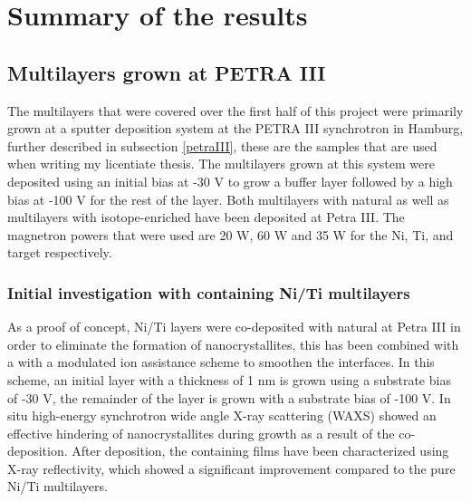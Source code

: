 \chapter{Summary of the results}\label{summaryresults}
\section{Multilayers grown at PETRA III}
The multilayers that were covered over the first half of this project were primarily grown at a sputter deposition system at the PETRA III synchrotron in Hamburg, further described in subsection \ref{petraIII}, these are the samples that are used when writing my licentiate thesis. The multilayers grown at this system were deposited using an initial bias at -30 V to grow a buffer layer followed by a high bias at -100 V for the rest of the layer. Both multilayers with natural \natBC as well as multilayers with isotope-enriched \BC have been deposited at Petra III. The magnetron powers that were used are 20 W, 60 W and 35 W for the Ni, Ti, and \natBC target respectively.\\
\subsection{Initial investigation with \natBC containing Ni/Ti multilayers}
As a proof of concept, Ni/Ti layers were co-deposited with natural \natBC at Petra III in order to eliminate the formation of nanocrystallites, this has been combined with a with a modulated ion assistance scheme to smoothen the interfaces. In this scheme, an initial layer with a thickness of 1 nm is grown using a substrate bias of -30 V, the remainder of the layer is grown with a substrate bias of -100 V. In situ high-energy synchrotron wide angle X-ray scattering (WAXS) showed an effective hindering of nanocrystallites during growth as a result of the \BC co-deposition. After deposition, the \natBC containing films have been characterized using X-ray reflectivity, which showed a significant improvement compared to the pure Ni/Ti multilayers.

